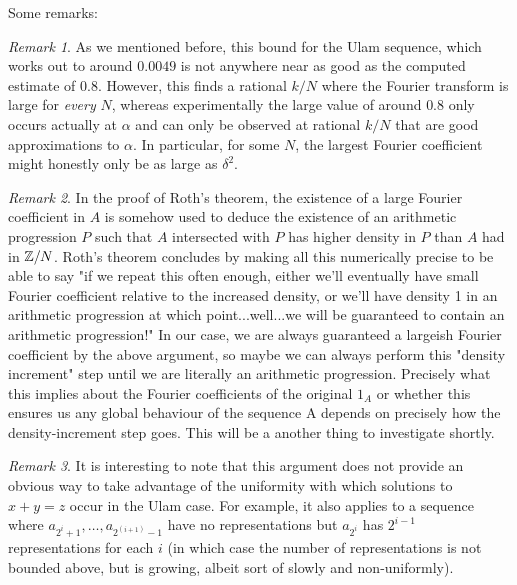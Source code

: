 \documentclass{article}
\theoremstyle{definition}
\theoremstyle{remark}
\newtheorem{remark}{Remark}
\numberwithin{equation}{section}
\begin{document}
Some remarks: 

\begin{remark}
  As we mentioned before, this bound for the Ulam sequence, which
  works out to around $0.0049$ is not anywhere near as good as the
  computed estimate of $0.8$.  However, this finds a rational $k/N$
  where the Fourier transform is large for \textit{every} $N$, whereas
  experimentally the large value of around $0.8$ only occurs actually
  at $\alpha$ and can only be observed at rational $k/N$ that are good
  approximations to $\alpha$.  In particular, for some $N$, the
  largest Fourier coefficient might honestly only be as large as
  $\delta^2$.
\end{remark}

\begin{remark}
  In the proof of Roth's theorem, the existence of a large Fourier
  coefficient in $A$ is somehow used to deduce the existence of an
  arithmetic progression $P$ such that $A$ intersected with $P$ has
  higher density in $P$ than $A$ had in $\mathbb{Z}/N$.  Roth's theorem
  concludes by making all this numerically precise to be able to say
  "if we repeat this often enough, either we'll eventually have small
  Fourier coefficient relative to the increased density, or we'll have
  density 1 in an arithmetic progression at which point...well...we
  will be guaranteed to contain an arithmetic progression!"  In our
  case, we are always guaranteed a largeish Fourier coefficient by the
  above argument, so maybe we can always perform this "density
  increment" step until we are literally an arithmetic progression.
  Precisely what this implies about the Fourier coefficients of the
  original $1_A$ or whether this ensures us any global behaviour of
  the sequence A depends on precisely how the density-increment step
  goes.  This will be a another thing to investigate shortly.
\end{remark}

\begin{remark}
  It is interesting to note that this argument does not provide an
  obvious way to take advantage of the uniformity with which solutions
  to $x+y=z$ occur in the Ulam case.  For example, it also applies to
  a sequence where $a_{2^i+1}, \ldots, a_{2^(i+1)-1}$ have no
  representations but $a_{2^i}$ has $2^{i-1}$ representations for each
  $i$ (in which case the number of representations is not bounded
  above, but is growing, albeit sort of slowly and non-uniformly).
\end{remark}
\end{document}
